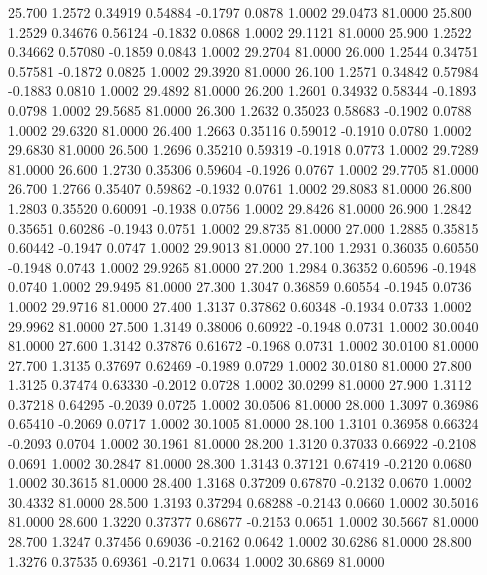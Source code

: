   25.700   1.2572   0.34919   0.54884  -0.1797   0.0878   1.0002  29.0473  81.0000
  25.800   1.2529   0.34676   0.56124  -0.1832   0.0868   1.0002  29.1121  81.0000
  25.900   1.2522   0.34662   0.57080  -0.1859   0.0843   1.0002  29.2704  81.0000
  26.000   1.2544   0.34751   0.57581  -0.1872   0.0825   1.0002  29.3920  81.0000
  26.100   1.2571   0.34842   0.57984  -0.1883   0.0810   1.0002  29.4892  81.0000
  26.200   1.2601   0.34932   0.58344  -0.1893   0.0798   1.0002  29.5685  81.0000
  26.300   1.2632   0.35023   0.58683  -0.1902   0.0788   1.0002  29.6320  81.0000
  26.400   1.2663   0.35116   0.59012  -0.1910   0.0780   1.0002  29.6830  81.0000
  26.500   1.2696   0.35210   0.59319  -0.1918   0.0773   1.0002  29.7289  81.0000
  26.600   1.2730   0.35306   0.59604  -0.1926   0.0767   1.0002  29.7705  81.0000
  26.700   1.2766   0.35407   0.59862  -0.1932   0.0761   1.0002  29.8083  81.0000
  26.800   1.2803   0.35520   0.60091  -0.1938   0.0756   1.0002  29.8426  81.0000
  26.900   1.2842   0.35651   0.60286  -0.1943   0.0751   1.0002  29.8735  81.0000
  27.000   1.2885   0.35815   0.60442  -0.1947   0.0747   1.0002  29.9013  81.0000
  27.100   1.2931   0.36035   0.60550  -0.1948   0.0743   1.0002  29.9265  81.0000
  27.200   1.2984   0.36352   0.60596  -0.1948   0.0740   1.0002  29.9495  81.0000
  27.300   1.3047   0.36859   0.60554  -0.1945   0.0736   1.0002  29.9716  81.0000
  27.400   1.3137   0.37862   0.60348  -0.1934   0.0733   1.0002  29.9962  81.0000
  27.500   1.3149   0.38006   0.60922  -0.1948   0.0731   1.0002  30.0040  81.0000
  27.600   1.3142   0.37876   0.61672  -0.1968   0.0731   1.0002  30.0100  81.0000
  27.700   1.3135   0.37697   0.62469  -0.1989   0.0729   1.0002  30.0180  81.0000
  27.800   1.3125   0.37474   0.63330  -0.2012   0.0728   1.0002  30.0299  81.0000
  27.900   1.3112   0.37218   0.64295  -0.2039   0.0725   1.0002  30.0506  81.0000
  28.000   1.3097   0.36986   0.65410  -0.2069   0.0717   1.0002  30.1005  81.0000
  28.100   1.3101   0.36958   0.66324  -0.2093   0.0704   1.0002  30.1961  81.0000
  28.200   1.3120   0.37033   0.66922  -0.2108   0.0691   1.0002  30.2847  81.0000
  28.300   1.3143   0.37121   0.67419  -0.2120   0.0680   1.0002  30.3615  81.0000
  28.400   1.3168   0.37209   0.67870  -0.2132   0.0670   1.0002  30.4332  81.0000
  28.500   1.3193   0.37294   0.68288  -0.2143   0.0660   1.0002  30.5016  81.0000
  28.600   1.3220   0.37377   0.68677  -0.2153   0.0651   1.0002  30.5667  81.0000
  28.700   1.3247   0.37456   0.69036  -0.2162   0.0642   1.0002  30.6286  81.0000
  28.800   1.3276   0.37535   0.69361  -0.2171   0.0634   1.0002  30.6869  81.0000

